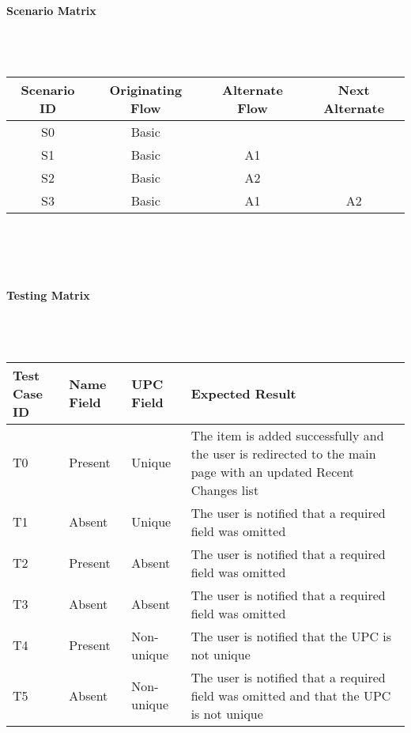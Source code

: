 \documentclass{article}
\begin{document}
\paragraph{Scenario Matrix}~\\ \\
\begin{tabular}{ c  c  c  c }
\hline
Scenario ID & Originating Flow & Alternate Flow & Next Alternate\\
\hline
\hline
S0 & Basic &  & \\
\hline
S1 & Basic & A1 & \\
\hline
S2 & Basic & A2 & \\
\hline
S3 & Basic & A1 & A2\\
\hline
\end{tabular}\\
~\\
~\\
\paragraph{Testing Matrix}~\\ \\
\begin{tabular}{ p{0.8in}  p{0.7in}  p{0.7in}  p{3.3in} }
\hline
Test Case ID & Name Field & UPC Field & Expected Result\\
\hline
\hline
T0 & Present & Unique & The item is added successfully and the user is redirected to the main page with an updated Recent Changes list\\
\hline
T1 & Absent & Unique & The user is notified that a required field was omitted\\
\hline
T2 & Present & Absent & The user is notified that a required field was omitted\\
\hline
T3 & Absent & Absent & The user is notified that a required field was omitted\\
\hline
T4 & Present & Non-unique & The user is notified that the UPC is not unique\\
\hline
T5 & Absent & Non-unique & The user is notified that a required field was omitted and that the UPC is not unique\\
\hline
\end{tabular}\\
~\\
~\\
\end{document}
